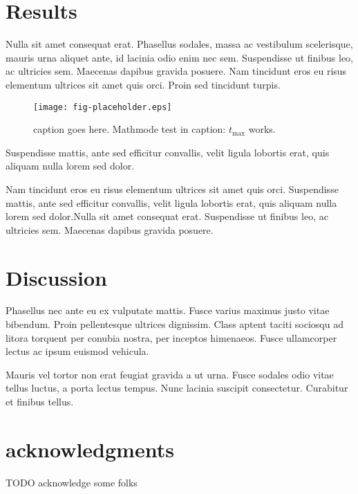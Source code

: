 \documentclass[12pt,oneside]{article}
\begin{document}
\section{Results}\label{results}

Nulla sit amet consequat erat. Phasellus sodales, massa ac vestibulum
scelerisque, mauris urna aliquet ante, id lacinia odio enim nec sem.
Suspendisse ut finibus leo, ac ultricies sem. Maecenas dapibus gravida
posuere. Nam tincidunt eros eu risus elementum ultrices sit amet quis
orci. Proin sed tincidunt turpis.

\begin{figure}[htbp]
\centering
\texttt{[image: fig-placeholder.eps]}
\caption{caption goes here. Mathmode test in caption: \(t_\mathrm{max}\)
works.}
\end{figure}

Suspendisse mattis, ante sed efficitur convallis, velit ligula lobortis
erat, quis aliquam nulla lorem sed dolor.

Nam tincidunt eros eu risus elementum ultrices sit amet quis orci.
Suspendisse mattis, ante sed efficitur convallis, velit ligula lobortis
erat, quis aliquam nulla lorem sed dolor.Nulla sit amet consequat erat.
Suspendisse ut finibus leo, ac ultricies sem. Maecenas dapibus gravida
posuere.

\section{Discussion}\label{discussion}

Phasellus nec ante eu ex vulputate mattis. Fusce varius maximus justo
vitae bibendum. Proin pellentesque ultrices dignissim. Class aptent
taciti sociosqu ad litora torquent per conubia nostra, per inceptos
himenaeos. Fusce ullamcorper lectus ac ipsum euismod vehicula.

Mauris vel tortor non erat feugiat gravida a ut urna. Fusce sodales odio
vitae tellus luctus, a porta lectus tempus. Nunc lacinia suscipit
consectetur. Curabitur et finibus tellus.

\cleardoublepage

\section*{acknowledgments}TODO acknowledge some folks\cleardoublepage

\end{document}
